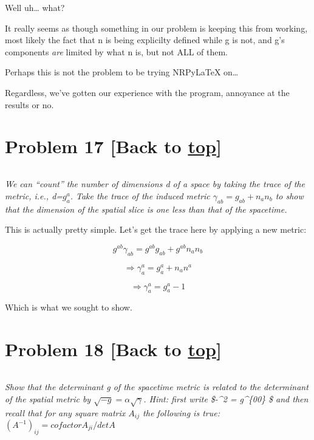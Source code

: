 \documentclass[landscape,letterpaper,10pt,english]{article}
\makeatletter
\newcommand{\boxspacing}{\kern\kvtcb@left@rule\kern\kvtcb@boxsep}
\newcommand{\prompt}[4]{
        {\ttfamily\llap{{\color{#2}[#3]:\hspace{3pt}#4}}\vspace{-\baselineskip}}
    }
\makeatother
\begin{document}
    Well uh\ldots{} what?

It really seems as though something in our problem is keeping this from
working, most likely the fact that n is being explicilty defined while g
is not, and g's components \emph{are} limited by what n is, but not ALL
of them.

Perhaps this is not the problem to be trying NRPyLaTeX on\ldots{}

Regardless, we've gotten our experience with the program, annoyance at
the results or no.

    \hypertarget{problem-17-back-to-top}{%
\section{\texorpdfstring{Problem 17 {[}Back to
\hyperref[toc]{top}{]}}{Problem 17 {[}Back to {]}}}\label{problem-17-back-to-top}}

\[\label{P17}\]

\emph{We can ``count'' the number of dimensions d of a space by taking
the trace of the metric, i.e., d=\(g^a_a\). Take the trace of the
induced metric \(\gamma_{ab} = g_{ab} + n_a n_b\) to show that the
dimension of the spatial slice is one less than that of the spacetime.}

This is actually pretty simple. Let's get the trace here by applying a
new metric:

\[g^{ab}\gamma_{ab} = g^{ab}g_{ab} + g^{ab}n_a n_b\]

\[ \Rightarrow \gamma^a_a= g^a_a + n_a n^a\]

\[ \Rightarrow \gamma^a_a= g^a_a -1\]

Which is what we sought to show.

    \hypertarget{problem-18-back-to-top}{%
\section{\texorpdfstring{Problem 18 {[}Back to
\hyperref[toc]{top}{]}}{Problem 18 {[}Back to {]}}}\label{problem-18-back-to-top}}

\[\label{P18}\]

\emph{Show that the determinant g of the spacetime metric is related to
the determinant of the spatial metric by
\(\sqrt{-g} = \alpha \sqrt{\gamma}\). Hint: first write \$-\alpha\^{}2 =
g\^{}\{00\} \$ and then recall that for any square matrix \(A_{ij}\) the
following is true: \((A^{-1})_{ij} = cofactorA_{ji}/detA\)}

    \begin{tcolorbox}[breakable, size=fbox, boxrule=1pt, pad at break*=1mm,colback=cellbackground, colframe=cellborder]
\prompt{In}{incolor}{ }{\boxspacing}
\begin{Verbatim}[commandchars=\\\{\}]

\end{Verbatim}
\end{tcolorbox}
\end{document}
